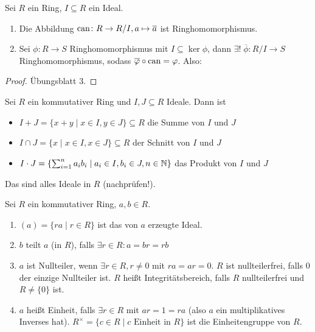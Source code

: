 \documentclass[12pt,a4paper]{scrartcl}
\begin{document}
\begin{satz}[Homomorphiesatz] \label{thm:homsatz_r}
	Sei $R$ ein Ring, $I\subseteq R$ ein Ideal. \begin{enumerate}
		\item Die Abbildung $\operatorname{can}\colon R\to R/I, a\mapsto \overline{a}$ ist Ringhomomorphismus.
		\item Sei $\phi\colon R\to S$ Ringhomomorphismus mit $I\subseteq \ker \phi$, dann $\exists!\;\overline{\phi}\colon R/I\to S$ Ringhomomorphismus, sodass $\overline{\varphi}\circ \operatorname{can}  = \varphi$. Also:
		\begin{center}
		\end{center}
	\end{enumerate}
\end{satz}

\begin{proof}
	Übungsblatt 3.
\end{proof} 

\begin{defi}
	Sei $R$ ein kommutativer Ring und $I, J\subseteq R$ Ideale. Dann ist \begin{itemize}
		\item $I+J = \{x+y \mid x\in I, y\in J\}\subseteq R$ die Summe von $I$ und $J$
		\item $I\cap J = \{x \mid x\in I, x\in J\}\subseteq R$ der Schnitt von $I$ und $J$
		\item $I\cdot J = \{\sum_{i = 1}^na_ib_i \mid a_i\in I, b_i\in J, n\in\mathbb N\}$ das Produkt von $I$ und $J$
	\end{itemize}
	Das sind alles Ideale in $R$ (nachprüfen!).
\end{defi}

\begin{defi}
	Sei $R$ ein kommutativer Ring, $a,b\in R$. \begin{enumerate}
		\item $(a) = \{ra\mid r\in R\}$ ist das von $a$ erzeugte Ideal.
		\item $b$ teilt $a$ (in $R$), falls $\exists r\in R: a = br = rb$
		\item 
		$a$ ist Nullteiler, wenn $\exists r\in R, r \neq 0$ mit $ra = ar = 0$. $R$ ist nullteilerfrei, falls 0 der einzige Nullteiler ist.
		$R$ heißt Integritätsbereich, falls $R$ nullteilerfrei und $R \neq \{0\}$ ist.
		\item $a$ heißt Einheit, falls $\exists r\in R$ mit $ar = 1 = ra$ (also $a$ ein multiplikatives Inverses hat).
		$R^{\times} = \{c\in R \mid c \text{ Einheit in } R\}$ ist die Einheitengruppe von $R$.
	\end{enumerate}
\end{defi}
\end{document}
